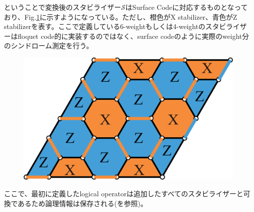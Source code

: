 \documentclass[a4paper,9pt]{ltjsarticle}
\begin{document}
{    ということで変換後のスタビライザー$\mathcal{S}$はSurface Codeに対応するものとなっており、Fig.\ref{figure4}に示すようになっている。ただし、橙色がX stabilizer、青色がZ stabilizerを表す。ここで定義している6-weightもしくは4-weightのスタビライザーはfloquet code的に実装するのではなく、surface codeのように実際のweight分のシンドローム測定を行う。

    \begin{figure}[h]
        \centering
        \includegraphics[scale=0.15]{figure/figure4.eps}
        \vspace{10pt}\caption{}
        \label{figure4}
        \vspace{-15pt}
    \end{figure}

    ここで、最初に定義したlogical operatorは追加したすべてのスタビライザーと可換であるため論理情報は保存される(\cite{fu2024}を参照)。
}
\end{document}
